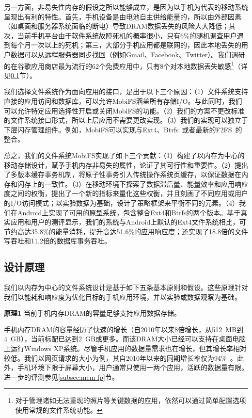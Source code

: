 另一方面，非易失性内存的假设之所以能够成立，是因为以手机为代表的移动系统呈现出有利的特性。首先，手机设备是由电池自主供给能量的，所以由外部因素（如桌面和服务器系统面临的断电）导致DRAM数据丢失的风险大大降低；其次，当前手机平台由于软件系统故障死机的概率很小，只有6\%的随机调查用户遇到每个月一次以上的死机；第三，大部分手机应用都是联网的，因此本地丢失的用户数据可以从远程服务器同步找回（例如Gmail、Facebook、Twitter）。我们调研的在谷歌应用商店最为流行的62个免费应用中，只有8个对本地数据丢失敏感\footnote{对于管理诸如无法重现的照片等关键数据的应用，依然可以通过简单配置选项使用常规的文件系统功能。}（详见\ref{subsec:insight}节）。

我们选择文件系统作为面向应用的接口，是出于以下三个原因：（1）文件系统支持直接的应用访问和数据库，可以允许MobiFS涵盖所有存储I/O。与此同时，我们可以允许特定应用选择性开启或关闭MobiFS的功能。（2）我们的方案不更改标准的文件系统接口形式，所以上层应用不需要更改实现。（3）我们的实现可以独立于下层闪存管理组件。例如，MobiFS可以实现与Ext4、Btrfs~\cite{Rodeh:2013:BLB:2501620.2501623}或者最新的F2FS~\cite{188454}的整合。

总之，我们的文件系统MobiFS实现了如下三个贡献：（1）构建了以内存为中心的移动存储设计，赋予手机内存非易失的属性，论证了其可行性和重要性。（2）提出了多版本缓存事务机制，将原子性事务引入传统操作系统页缓存，以保证数据在内存和闪存上的一致性。（3）在移动环境下探索了数据滞后量、能量效率和应用响应度之间的权衡，提出了一个新的指标来量化这些权衡，并且刻画了不同应用或用户的I/O访问模式；以实验数据为基础，设计了策略框架来平衡不同的元素。（4）我们在Android上实现了可用的原型系统，包含整合Ext4和Btrfs的两个版本。基于真实应用和用户的测评显示，我们的系统与Android上默认的Ext4文件系统相比，可节约高达35.8\%的能量消耗，提升高达51.6\%的应用响应度；还实现了18.8倍的文件写吞吐和11.2倍的数据库事务吞吐。

\subsection{设计原理}
\label{subsec:insight}

我们以内存为中心的文件系统设计是基于如下五条基本原则和假设。这些原理针对我们以能耗和响应度为优化目标的手机应用环境，并以实验或数据观察为基础。

\textbf{原理1} 当前手机内存DRAM的容量足够支持应用数据存储。

手机内存DRAM的容量经历了快速的增长（自2010年以来8倍增长，从512~MB到4~GB），当前标配已达到2~GB或更多。而该DRAM大小已经可以支持在桌面电脑上运行Windows XP系统。尽管手机应用的数据量需求也在增长，但其增长率相对较低。我们以网页请求的大小为例，其自2010年以来的同期增长率仅为94\%~\cite{HTTP:Transfer:2013}。此外，手机环境下限于屏幕大小，用户通常只使用一两个应用，活跃的数据量有限。进一步的评测参见\ref{subsec:mem-fp}节。

